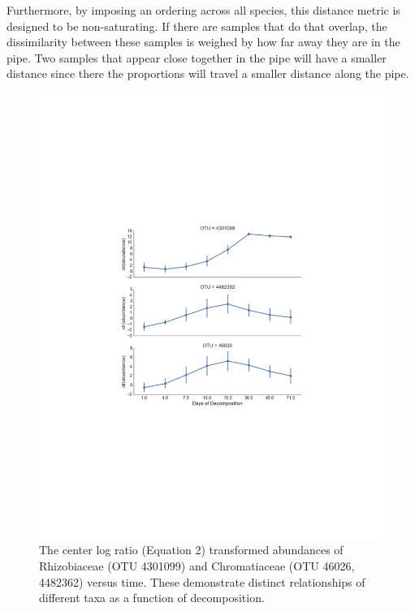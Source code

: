  Furthermore, by imposing an ordering across all species, this distance metric is designed to be non-saturating.  If there are samples that do that overlap, the dissimilarity between these samples is weighed by how far away they are in the pipe.  Two samples that appear close together in the pipe will have a smaller distance since there the proportions will travel a smaller distance along the pipe.\\[5 mm]
%
 \begin{figure}[H]
         \centering
         \includegraphics[width=1\textwidth]{appendix_a/FigureS2.pdf}
         \caption[Abundances of taxa across time in the post-mortem experiment.]
         {The center log ratio (Equation 2) transformed abundances of Rhizobiaceae (OTU 4301099) and Chromatiaceae (OTU 46026, 4482362) versus time. These demonstrate distinct relationships of different taxa as a function of decomposition.}
         \label{figaS2}
 \end{figure}
%

